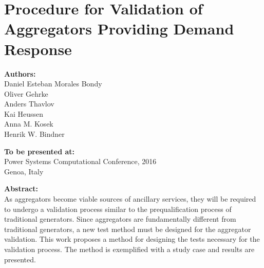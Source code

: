 \chapter{Procedure for Validation of Aggregators Providing Demand Response}\label{app:pscc2016}

\textbf{Authors:}\\
Daniel Esteban Morales Bondy\\
Oliver Gehrke\\
Anders Thavlov\\
Kai Heussen\\
Anna M. Kosek\\
Henrik W. Bindner

\noindent
\textbf{To be presented at:}\\
Power Systems Computational Conference, 2016 \\
Genoa, Italy


\noindent
\textbf{Abstract:}\\
As aggregators become viable sources of ancillary services, they will be required to undergo a validation process similar to the prequalification process of traditional generators. Since aggregators are fundamentally different from traditional generators, a new test method must be designed for the aggregator validation. This work proposes a method for designing the tests necessary for the validation process. The method is exemplified with a study case and results are presented.



%

%



